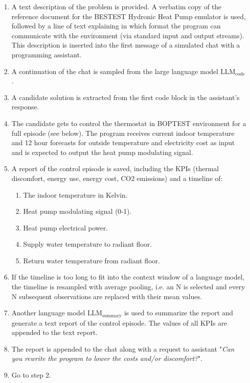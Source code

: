 \begin{enumerate}
  \item A text description of the problem is provided. A verbatim copy of the reference document for the BESTEST Hydronic Heat Pump emulator is used, followed by a line of text explaining in which format the program can communicate with the environment (via standard input and output streams). This description is inserted into the first message of a simulated chat with a programming assistant.
  \item A continuation of the chat is sampled from the large language model $\text{LLM}_\text{code}$.
  \item A candidate solution is extracted from the first code block in the assistant’s response.
  \item The candidate gets to control the thermostat in BOPTEST environment for a full episode (see below). The program receives current indoor temperature and 12 hour forecasts for outside temperature and electricity cost as input and is expected to output the heat pump modulating signal.
  \item A report of the control episode is saved, including the KPIs (thermal discomfort, energy use, energy cost, CO2 emissions) and a timeline of:
  \begin{enumerate}
      \item The indoor temperature in Kelvin.
      \item Heat pump modulating signal (0-1).
      \item Heat pump electrical power.
      \item Supply water temperature to radiant floor.
      \item Return water temperature from radiant floor.
  \end{enumerate}
  \item If the timeline is too long to fit into the context window of a language model, the timeline is resampled with average pooling, i.e. an N is selected and every N subsequent observations are replaced with their mean values.
  \item Another language model $\text{LLM}_\text{summary}$ is used to summarize the report and generate a text report of the control episode. The values of all KPIs are appended to the text report.
  \item The report is appended to the chat along with a request to assistant "\textit{Can you rewrite the program to lower the costs and/or discomfort?}".
  \item Go to step 2.
\end{enumerate}

